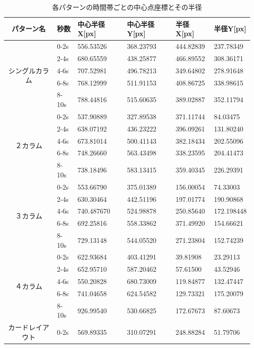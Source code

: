 \begin{table}[h]
  \caption{各パターンの時間帯ごとの中心点座標とその半径}
  \label{table:layoutresult}
  \footnotesize
  \centering
    \begin{tabular}{clllll}
    \hline
    パターン名 & 秒数 & 中心半径X[px] & 中心半径Y[px] & 半径X[px] & 半径Y[px] \\
    \hline \hline
    \multirow{5}{*}{シングルカラム} & 0-2s & 556.53526 & 368.23793 & 444.82839 & 237.78349 \\
    & 2-4s & 680.65559 & 438.25877 & 466.89552 & 308.36171 \\
    & 4-6s & 707.52981 & 496.78213 & 349.64802 & 278.91648 \\
    & 6-8s & 768.12999 & 511.91153 & 408.86725 & 338.98615 \\
    & 8-10s & 788.44816 & 515.60635 & 389.02887 & 352.11794 \\
    \hline
    \multirow{5}{*}{２カラム} & 0-2s & 537.90889 & 327.89538 & 371.11744 & 84.03475 \\
    & 2-4s & 638.07192 & 436.23222 & 396.09261 & 131.80240 \\
    & 4-6s & 673.81014 & 500.41143 & 382.18434 & 202.55096 \\
    & 6-8s & 748.26660 & 563.43498 & 338.23595 & 204.41473 \\
    & 8-10s & 738.18496 & 583.13415 & 359.40345 & 226.29391 \\
    \hline
    \multirow{5}{*}{３カラム} & 0-2s & 553.66790 & 375.01389 & 156.00054 & 74.33003 \\
    & 2-4s & 630.30464 & 442.51196 & 197.01774 & 190.90868 \\
    & 4-6s & 740.487670 & 524.98878 & 250.85640 & 172.198448 \\
    & 6-8s & 692.25816 & 558.33862 & 371.49920 & 154.66621 \\
    & 8-10s & 729.13148 & 544.05520 & 271.23804 & 152.74239 \\
    \hline
    \multirow{5}{*}{４カラム} & 0-2s & 622.93684 & 403.41291 & 39.81908 & 23.29113 \\
    & 2-4s & 652.95710 & 587.20462 & 57.61500 & 43.52946 \\
    & 4-6s & 550.20828 & 680.73009 & 119.84877 & 132.47447 \\
    & 6-8s & 741.04658 & 624.54582 & 129.73321 & 175.20079 \\
    & 8-10s & 926.99540 & 530.66825 & 172.67673 & 87.60673 \\
    \hline
    \multirow{5}{*}{カードレイアウト} & 0-2s & 569.89335 & 310.07291 & 248.88284 & 51.79706 \\

\end{tabular}
\end{table}
